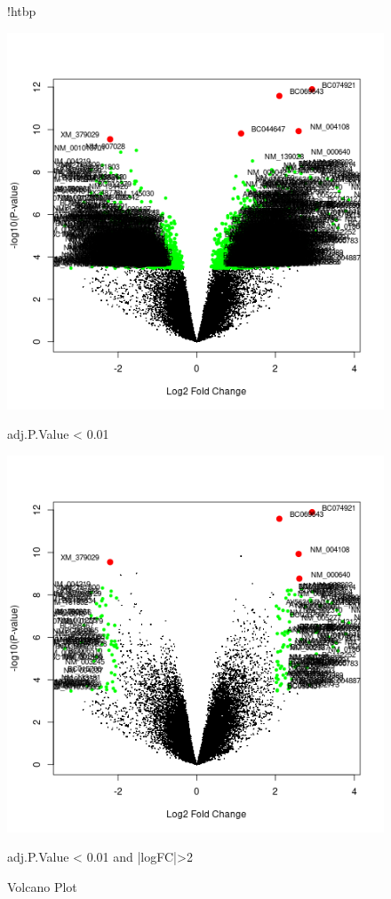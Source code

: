 \documentclass[12pt, ]{article}
\begin{document}
\begin{figure}{!htbp}

\begin{minipage}{.48\textwidth}
\includegraphics[width=\textwidth]{VolcanoPlotadj.png}
\scriptsize\centerline{adj.P.Value < 0.01}
\end{minipage}\hfill
\begin{minipage}{.48\textwidth}
\includegraphics[width=\textwidth]{VolcanoPlotadjlogFC.png}
\scriptsize\centerline{adj.P.Value < 0.01 and |logFC|>2}
\end{minipage}
\caption{Volcano Plot}
\end{figure}
\end{document}
